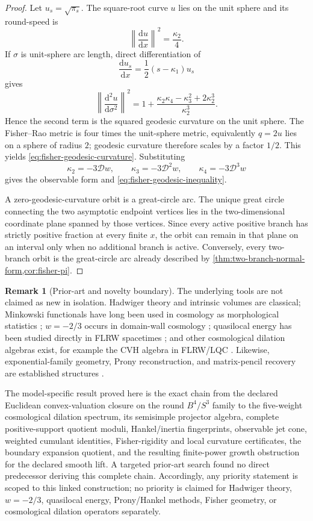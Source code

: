 \documentclass[aps,prd,preprint,onecolumn,nofootinbib,superscriptaddress,showkeys]{revtex4-2}
\numberwithin{equation}{section}
\theoremstyle{definition}
\newtheorem{remark}{Remark}[section]
\theoremstyle{plain}
\newcommand{\dd}{\mathrm d}
\newcommand{\Dil}{\mathscr D}
\begin{document}
\begin{proof}
Let \(u_s=\sqrt{\pi_s}\).  The square-root curve \(u\) lies on the unit sphere and its round-speed is
\[
\left\|\frac{\dd u}{\dd x}\right\|^2=\frac{\kappa_2}{4}.
\]
If \(\sigma\) is unit-sphere arc length, direct differentiation of
\[
\frac{\dd u_s}{\dd x}=\frac12(s-\kappa_1)u_s
\]
gives
\[
\left\|\frac{\dd^2u}{\dd\sigma^2}\right\|^2
=
1+
\frac{\kappa_2\kappa_4-\kappa_3^2+2\kappa_2^3}{\kappa_2^3}.
\]
Hence the second term is the squared geodesic curvature on the unit sphere.  The Fisher--Rao metric is four times the unit-sphere metric, equivalently \(q=2u\) lies on a sphere of radius \(2\); geodesic curvature therefore scales by a factor \(1/2\).  This yields \cref{eq:fisher-geodesic-curvature}.  Substituting
\[
\kappa_2=-3\Dil w,\qquad
\kappa_3=-3\Dil^2w,\qquad
\kappa_4=-3\Dil^3w
\]
gives the observable form and \cref{eq:fisher-geodesic-inequality}.

A zero-geodesic-curvature orbit is a great-circle arc.  The unique great circle connecting the two asymptotic endpoint vertices lies in the two-dimensional coordinate plane spanned by those vertices.  Since every active positive branch has strictly positive fraction at every finite \(x\), the orbit can remain in that plane on an interval only when no additional branch is active.  Conversely, every two-branch orbit is the great-circle arc already described by \cref{thm:two-branch-normal-form,cor:fisher-pi}.
\end{proof}

\begin{remark}[Prior-art and novelty boundary]\label{rem:novelty-boundary}
The underlying tools are not claimed as new in isolation.  Hadwiger theory and intrinsic volumes are classical; Minkowski functionals have long been used in cosmology as morphological statistics \cite{SchmalzingKerscherBuchert1996}; \(w=-2/3\) occurs in domain-wall cosmology \cite{BattyeBucherSpergel1999}; quasilocal energy has been studied directly in FLRW spacetimes \cite{Afshar2009,OlteanEtAl2021}; and other cosmological dilation algebras exist, for example the CVH algebra in FLRW/LQC \cite{BenAchourLivine2017}.  Likewise, exponential-family geometry, Prony reconstruction, and matrix-pencil recovery are established structures \cite{HuaSarkar1990,PeterPlonka2013,FischerEtAl2020,Karev2010}.

The model-specific result proved here is the exact chain from the declared Euclidean convex-valuation closure on the round \(B^4/S^3\) family to the five-weight cosmological dilation spectrum, its semisimple projector algebra, complete positive-support quotient moduli, Hankel/inertia fingerprints, observable jet cone, weighted cumulant identities, Fisher-rigidity and local curvature certificates, the boundary expansion quotient, and the resulting finite-power growth obstruction for the declared smooth lift.  A targeted prior-art search found no direct predecessor deriving this complete chain.  Accordingly, any priority statement is scoped to this linked construction; no priority is claimed for Hadwiger theory, \(w=-2/3\), quasilocal energy, Prony/Hankel methods, Fisher geometry, or cosmological dilation operators separately.
\end{remark}
\end{document}
